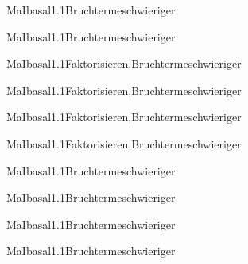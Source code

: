 \documentclass[12pt]{article}
\begin{document}
    \begin{Add}{MaI}{basal1.1}{Bruchterme}{schwieriger}
    \solution{ }
    \end{Add}
    \begin{Add}{MaI}{basal1.1}{Bruchterme}{schwieriger}
    \end{Add}
    

   \begin{Add}{MaI}{basal1.1}{Faktorisieren,Bruchterme}{schwieriger}
   \solution{ }
   \end{Add}
   \begin{Add}{MaI}{basal1.1}{Faktorisieren,Bruchterme}{schwieriger}
   \end{Add}
   

   \begin{Add}{MaI}{basal1.1}{Faktorisieren,Bruchterme}{schwieriger}
   \solution{ }
   \end{Add}
   \begin{Add}{MaI}{basal1.1}{Faktorisieren,Bruchterme}{schwieriger}
   \end{Add}
   

   \begin{Add}{MaI}{basal1.1}{Bruchterme}{schwieriger}
   \solution{ }
   \end{Add}
   \begin{Add}{MaI}{basal1.1}{Bruchterme}{schwieriger}
   \end{Add}
   

   \begin{Add}{MaI}{basal1.1}{Bruchterme}{schwieriger}
   \solution{ }
   \end{Add}
   \begin{Add}{MaI}{basal1.1}{Bruchterme}{schwieriger}
   \end{Add}
   
\end{document}
